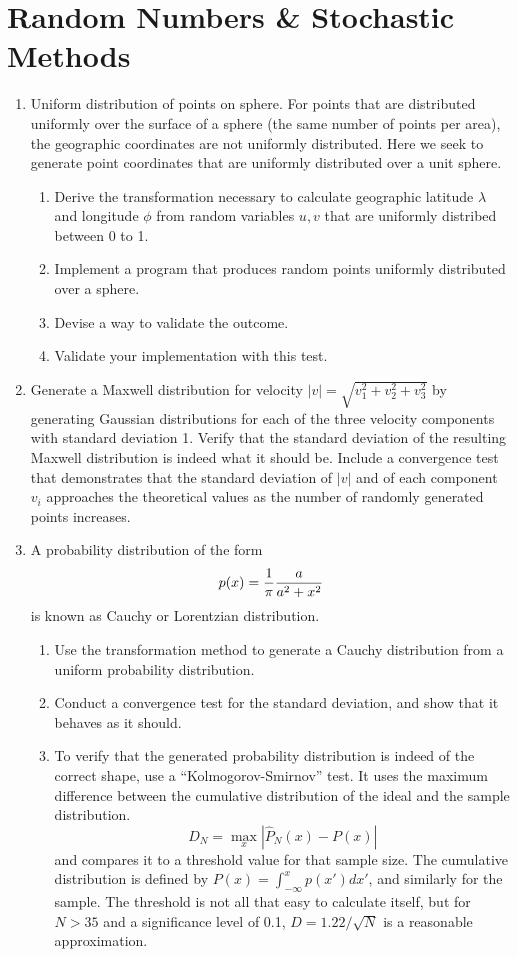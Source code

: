 \documentclass{article}
\begin{document}
\section{Random Numbers \& Stochastic Methods}
\begin{enumerate}
\item
Uniform distribution of points on sphere.
For points that are distributed uniformly over the surface of a sphere (the same number of points per area), the geographic coordinates are not uniformly distributed. Here we seek to generate point coordinates that are uniformly distributed over a unit sphere.
\begin{enumerate} \setlength{\itemsep}{0pt}
\item Derive the transformation necessary to calculate geographic latitude $\lambda$ and longitude $\phi$ from random variables $u, v$ that are uniformly distribed between 0 to 1.
\item Implement a program that produces random points uniformly distributed over a sphere.
\item Devise a way to validate the outcome.
\item Validate your implementation with this test.
\end{enumerate}

\item
Generate a Maxwell distribution for velocity $|v|=\sqrt{v_1^2+v_2^2+v_3^2}$ by generating Gaussian distributions for each of the three velocity components with standard deviation 1. Verify that the standard deviation of the resulting Maxwell distribution is indeed what it should be. Include a convergence test that demonstrates that the standard deviation of $|v|$ and of each component $v_i$ approaches the theoretical values as the number of randomly generated points increases.


\item
  A probability distribution of the form
  \[
  p(x) = \frac{1}{\pi} {a \over a^2+x^2}
  \]
  is known as Cauchy or Lorentzian distribution.
  \begin{enumerate} \setlength{\itemsep}{0pt}
  \item Use the transformation method to generate a Cauchy distribution from a uniform probability distribution.
  \item Conduct a convergence test for the standard deviation, and show that it behaves as it should.
  \item To verify that the generated probability distribution is indeed of the correct shape, use a ``Kolmogorov-Smirnov'' test.  It uses the maximum difference between the cumulative distribution of the ideal and the sample distribution.
    \[
    D_N = \max_x |\hat P_N(x) - P(x) |
    \]
    and compares it to a threshold value for that sample size.
    The cumulative distribution is defined by $P(x)=\int_{-\infty}^x p(x') dx'$, and similarly for the sample. The threshold is not all that easy to calculate itself, but for $N>35$ and a significance level of 0.1, $D=1.22/\sqrt{N}$ is a reasonable approximation. 
  \end{enumerate}
  
\end{enumerate}
\end{document}
